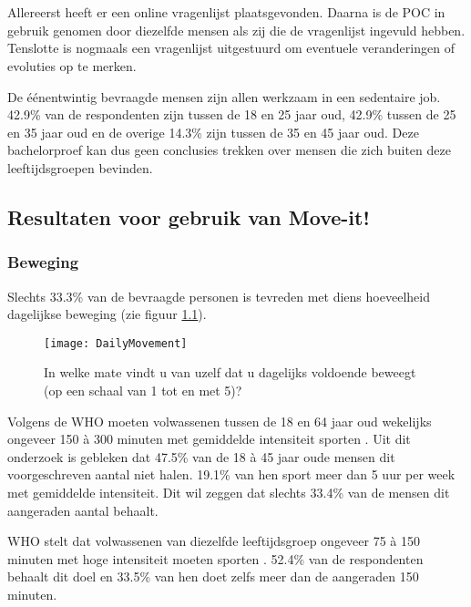 \chapter{}%
\label{ch:analyse}

Allereerst heeft er een online vragenlijst plaatsgevonden. Daarna is de POC in gebruik genomen door diezelfde mensen als zij die de vragenlijst ingevuld hebben. Tenslotte is nogmaals een vragenlijst uitgestuurd om eventuele veranderingen of evoluties op te merken.

De éénentwintig bevraagde mensen zijn allen werkzaam in een sedentaire job. 42.9\% van de respondenten zijn tussen de 18 en 25 jaar oud, 42.9\% tussen de 25 en 35 jaar oud en de overige 14.3\% zijn tussen de 35 en 45 jaar oud. Deze bachelorproef kan dus geen conclusies trekken over mensen die zich buiten deze leeftijdsgroepen bevinden.

\section{Resultaten voor gebruik van Move-it!}

\subsection{Beweging}
Slechts 33.3\% van de bevraagde personen is tevreden met diens hoeveelheid dagelijkse beweging (zie figuur \ref{fig:dagelijkseBeweging}).

\begin{figure}[h]
    \caption[In welke mate vindt u van uzelf dat u dagelijks voldoende beweegt?]{In welke mate vindt u van uzelf dat u dagelijks voldoende beweegt (op een schaal van 1 tot en met 5)?}
    \texttt{[image: DailyMovement]}
    \label{fig:dagelijkseBeweging}
\end{figure}

Volgens de WHO moeten volwassenen tussen de 18 en 64 jaar oud wekelijks ongeveer 150 à 300 minuten met gemiddelde intensiteit sporten \autocite{Bull2020}.
Uit dit onderzoek is gebleken dat 47.5\% van de 18 à 45 jaar oude mensen dit voorgeschreven aantal niet halen. 19.1\% van hen sport meer dan 5 uur per week met gemiddelde intensiteit. Dit wil zeggen dat slechts 33.4\% van de mensen dit aangeraden aantal behaalt.

WHO stelt dat volwassenen van diezelfde leeftijdsgroep ongeveer 75 à 150 minuten met hoge intensiteit moeten sporten \autocite{Bull2020}.
52.4\% van de respondenten behaalt dit doel en 33.5\% van hen doet zelfs meer dan de aangeraden 150 minuten.

